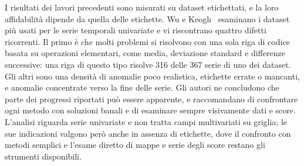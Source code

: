 I risultati dei lavori precedenti sono misurati su dataset etichettati, e la loro affidabilità dipende da quella delle etichette. Wu e Keogh~\cite{wu2021flawed} esaminano i dataset più usati per le serie temporali univariate e vi riscontrano quattro difetti ricorrenti. Il primo è che molti problemi si risolvono con una sola riga di codice basata su operazioni elementari, come media, deviazione standard e differenze successive: una riga di questo tipo risolve 316 delle 367 serie di uno dei dataset. Gli altri sono una densità di anomalie poco realistica, etichette errate o mancanti, e anomalie concentrate verso la fine delle serie. Gli autori ne concludono che parte dei progressi riportati può essere apparente, e raccomandano di confrontare ogni metodo con soluzioni banali e di esaminare sempre visivamente dati e score. L'analisi riguarda serie univariate e non tratta campi multivariati su griglia; le sue indicazioni valgono però anche in assenza di etichette, dove il confronto con metodi semplici e l'esame diretto di mappe e serie degli score restano gli strumenti disponibili.

